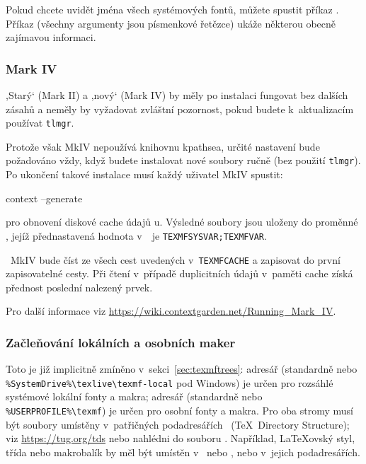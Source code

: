 \documentclass[\classoptions,slovak,english,czech]{\classname}
\newcommand{\singleuv}[1]{,#1`}
\begin{document}
Pokud chcete uvidět jména všech systémových fontů, můžete 
spustit příkaz .  
Příkaz  
(všechny argumenty jsou písmenkové řetězce) 
ukáže některou obecně zajímavou informaci.


\subsubsection{\protect\ConTeXt{} Mark IV}
\label{sec:context_mkiv}

\singleuv{Starý} \ConTeXt{} (Mark II) a \singleuv{nový} \ConTeXt{}
(Mark IV) by měly po instalaci \TL{} fungovat bez dalších zásahů
a neměly by vyžadovat zvláštní pozornost, pokud budete k~aktualizacím 
používat \verb+tlmgr+.

Protože však \ConTeXt{} MkIV nepoužívá knihovnu kpathsea, 
určité nastavení bude požadováno vždy, když budete instalovat nové 
soubory ručně (bez použití \verb+tlmgr+). Po ukončení takové instalace 
musí každý uživatel MkIV spustit:
\begin{sverbatim}
context --generate
\end{sverbatim}
pro obnovení diskové cache údajů \ConTeXt{}u.
Výsledné soubory jsou uloženy do proměnné ,
jejíž přednastavená hodnota v~\TL\ je \verb+TEXMFSYSVAR;TEXMFVAR+. 

\ConTeXt\ MkIV bude číst ze všech cest uvedených 
v~\verb+TEXMFCACHE+ a zapisovat do první zapisovatelné cesty. 
Při čtení v~případě duplicitních údajů v~paměti cache získá
přednost poslední nalezený prvek.

Pro další informace viz
\url{https://wiki.contextgarden.net/Running_Mark_IV}.


\subsubsection{Začleňování lokálních a osobních maker}
\label{sec:local_personal_macros}

Toto je již implicitně zmíněno v~sekci~\ref{sec:texmftrees}:
adresář  (standardně 
 nebo
\verb|%SystemDrive%\texlive\texmf-local| pod Windows)
je určen pro rozsáhlé systémové %
lokální fonty a makra; adresář
 (standardně  nebo
\verb|%USERPROFILE%\texmf|) je určen pro osobní fonty a makra.
Pro oba stromy musí být soubory umístěny v~patřičných 
podadresářích \TDS\ (\TeX\ Directory Structure);
viz \url{https://tug.org/tds} nebo nahlédni do souboru
. Například, \LaTeX{}ovský 
styl, třída nebo makrobalík by měl být umístěn
v~ nebo
, nebo v~jejich podadresářích.
\end{document}
